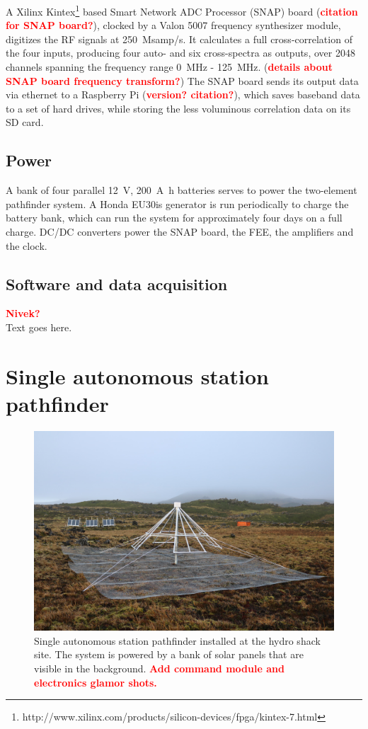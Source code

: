 \documentclass{ws-jai}
\def\prizm{PRI$^{\rm Z}$M}
\newcommand{\attention}[1]{\textcolor{red}{\bf {#1}}}
\begin{document}
A Xilinx Kintex\footnote{http://www.xilinx.com/products/silicon-devices/fpga/kintex-7.html} based Smart Network ADC Processor (SNAP) board (\attention{citation for SNAP board?}), 
clocked by a Valon 5007 frequency synthesizer module,
digitizes the RF signals at 250~Msamp/s. It calculates a full
cross-correlation of the four inputs, producing four auto- and six
cross-spectra as outputs, over 2048 channels spanning the frequency range 
\SI{0}{MHz} - \SI{125}{MHz}. 
(\attention{details about SNAP board frequency transform?})
The SNAP board sends its output data via ethernet to a Raspberry Pi (\attention{version? citation?}), which saves baseband data to a set of hard drives, while storing the less voluminous correlation data on its SD card.

\subsection{Power}

A bank of four parallel \SI{12}{V}, \SI{200}{\ampere\hour} batteries serves to power the two-element pathfinder system. A Honda EU30is generator is run periodically to charge the battery bank, which can run the system for approximately four days on a full charge.  DC/DC converters power the SNAP board, the FEE, the amplifiers and the clock.
\subsection{Software and data acquisition}
\attention{Nivek?} \\
Text goes here.

\section{Single autonomous station pathfinder}

\begin{figure}
  \begin{center}
    \includegraphics[width=0.7\linewidth]{Figures/autonomous.jpg}
    \caption{Single autonomous station pathfinder installed at the
      hydro shack site.  The system is powered by a bank of solar
      panels that are visible in the background.  \attention{
        Add command module and electronics glamor shots.}}
    \label{Fig:autonomous}
  \end{center}
\end{figure}
\end{document}
